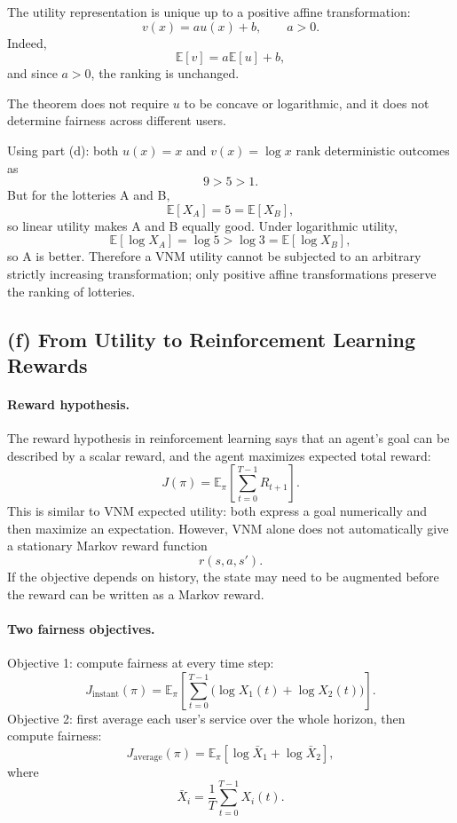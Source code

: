 \documentclass[11pt,a4paper]{article}
\begin{document}
The utility representation is unique up to a positive affine
transformation:
\[
v(x)=a u(x)+b,\qquad a>0.
\]
Indeed,
\[
\mathbb E[v]=a\mathbb E[u]+b,
\]
and since \(a>0\), the ranking is unchanged.

The theorem does not require \(u\) to be concave or logarithmic, and it
does not determine fairness across different users.

Using part (d): both \(u(x)=x\) and \(v(x)=\log x\) rank deterministic
outcomes as
\[
9>5>1.
\]
But for the lotteries A and B,
\[
\mathbb E[X_A]=5=\mathbb E[X_B],
\]
so linear utility makes A and B equally good. Under logarithmic utility,
\[
\mathbb E[\log X_A]=\log 5>\log 3=\mathbb E[\log X_B],
\]
so A is better. Therefore a VNM utility cannot be subjected to an arbitrary
strictly increasing transformation; only positive affine transformations
preserve the ranking of lotteries.

\subsection*{(f) From Utility to Reinforcement Learning Rewards}

\paragraph{Reward hypothesis.}
The reward hypothesis in reinforcement learning says that an agent's goal
can be described by a scalar reward, and the agent maximizes expected total
reward:
\[
J(\pi)=\mathbb E_\pi\left[\sum_{t=0}^{T-1}R_{t+1}\right].
\]
This is similar to VNM expected utility: both express a goal numerically
and then maximize an expectation. However, VNM alone does not automatically give a
stationary Markov reward function
\[
r(s,a,s').
\]
If the objective depends on history, the state may need to be augmented
before the reward can be written as a Markov reward.

\paragraph{Two fairness objectives.}
Objective 1: compute fairness at every time step:
\[
J_{\mathrm{instant}}(\pi)
=
\mathbb E_\pi\left[
\sum_{t=0}^{T-1}
\bigl(\log X_1(t)+\log X_2(t)\bigr)
\right].
\]
Objective 2: first average each user's service over the whole horizon,
then compute fairness:
\[
J_{\mathrm{average}}(\pi)
=
\mathbb E_\pi\left[
\log \bar X_1+\log \bar X_2
\right],
\]
where
\[
\bar X_i=\frac1T\sum_{t=0}^{T-1}X_i(t).
\]
\end{document}
